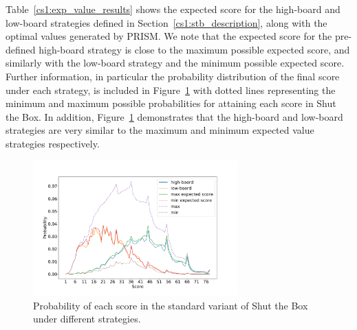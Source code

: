 Table~\ref{cs1:exp_value_results} shows the expected score for the high-board and low-board strategies defined in Section~\ref{cs1:stb_description}, along with the optimal values generated by PRISM. %
We note that the expected score for the pre-defined high-board strategy is close to the maximum possible expected score, and similarly with the low-board strategy and the minimum possible expected score. Further information, in particular the probability distribution of the final score under each strategy, is included in Figure~\ref{cs1:stb12_2d6_prob_score} with dotted lines representing the minimum and maximum possible probabilities for attaining each score in Shut the Box. In addition, Figure~\ref{cs1:stb12_2d6_prob_score} demonstrates that the high-board and low-board strategies are very similar to the maximum and minimum expected value strategies respectively.


\begin{figure}
    \centering
    \vspace*{-0.4cm}    \includegraphics[width=0.7\textwidth]{images/ShutTheBox/stb12_2d6_prob_score.pdf}
     \vspace*{-0.4cm}
   \caption{Probability of each score in the standard variant of Shut the Box under different strategies.}
    \vspace*{-0.2cm}
\label{cs1:stb12_2d6_prob_score}
\end{figure}



